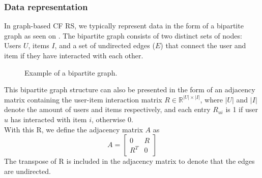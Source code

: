 \subsubsection*{Data representation}
In graph-based CF RS, we typically represent data in the form of a bipartite graph as seen on .
The bipartite graph consists of two distinct sets of nodes: Users $U$, items $I$, and a set of undirected edges ($E$) that connect the user and item if they have interacted with each other.
\begin{figure}[h]
\caption{Example of a bipartite graph.}
\label{fig:bipartite-graph}
\end{figure}

This bipartite graph structure can also be presented in the form of an adjacency matrix containing the user-item interaction matrix $R \in \mathbb{R}^{|U| \times |I|}$, where $|U|$ and $|I|$ denote the amount of users and items respectively, and each entry $R_{ui}$ is 1 if user $u$ has interacted with item $i$, otherwise 0.\\
With this R, we define the adjacency matrix $A$ as
$$A = \begin{bmatrix} 0 & R\\ R^T & 0 \end{bmatrix}$$
The transpose of R is included in the adjacency matrix to denote that the edges are undirected.

